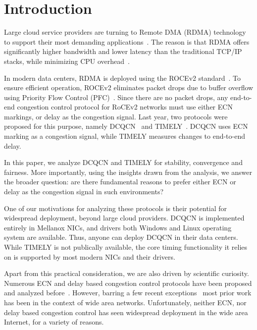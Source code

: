 \section{Introduction}

Large cloud service providers are turning to Remote DMA (RDMA) technology to
support their most demanding
applications~\cite{dcqcn,timely,tcp-bolt,erasure-storage,farm,pilaf}.  The
reason is that RDMA offers significantly higher bandwidth and lower latency than
the traditional TCP/IP stacks, while minimizing CPU
overhead~\cite{dcqcn,farm,timely}. 

In modern data centers, RDMA is deployed using the ROCEv2
standard~\cite{rocev2}. To ensure efficient operation, ROCEv2 eliminates packet
drops due to buffer overflow using Priority Flow Control (PFC)~\cite{pfc}.
Since there are no packet drops, any end-to-end congestion control protocol for
RoCEv2 networks must use either ECN markings, or delay as the congestion signal.
Last year, two protocols were proposed for this purpose, namely
DCQCN~\cite{dcqcn} and TIMELY~\cite{timely}. DCQCN uses ECN marking as a
congestion signal, while TIMELY measures changes to end-to-end delay.


In this paper, we analyze DCQCN and TIMELY for stability, convergence and
fairness. More importantly, using the insights drawn from the analysis, we
answer the broader question: are there fundamental reasons to prefer either ECN
or delay as the congestion signal in such environments?


One of our motivations for analyzing these protocols is their potential for
widespread deployment, beyond large cloud providers.  DCQCN is implemented
entirely in Mellanox NICs, and drivers both Windows and Linux operating system
are available. Thus, anyone can deploy DCQCN in their data centers. While TIMELY
is not publically available, the core timing functionality it relies on is
supported by most modern NICs and their drivers.

Apart from this practical consideration, we are also driven by scientific
curiosity.  Numerous ECN and delay based congestion control protocols have been
proposed and analyzed before~\cite{ecn, tcp-vegas,misra2000fluid,hollot2001designing,misra:TAC2002,gorinsky2004feedback}.
However, barring a few recent exceptions~\cite{dctcp-analysis, qcn-analysis}
most prior work has been in the context of wide area networks.  Unfortunately,
neither ECN, nor delay based congestion control has seen widespread deployment
in the wide area Internet, for a variety of reasons. 

